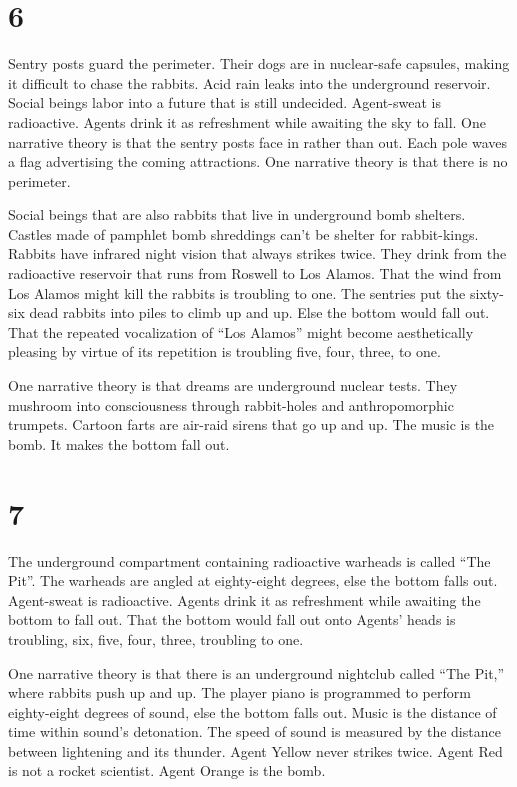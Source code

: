 \documentclass[
]{memoir}
\begin{document}
\hypertarget{section-7}{%
\section*{6}\label{section-7}}

Sentry posts guard the perimeter. Their dogs are in nuclear-safe
capsules, making it difficult to chase the rabbits. Acid rain leaks into
the underground reservoir. Social beings labor into a future that is
still undecided. Agent-sweat is radioactive. Agents drink it as
refreshment while awaiting the sky to fall. One narrative theory is that
the sentry posts face in rather than out. Each pole waves a flag
advertising the coming attractions. One narrative theory is that there
is no perimeter.

Social beings that are also rabbits that live in underground bomb
shelters. Castles made of pamphlet bomb shreddings can't be shelter for
rabbit-kings. Rabbits have infrared night vision that always strikes
twice. They drink from the radioactive reservoir that runs from Roswell
to Los Alamos. That the wind from Los Alamos might kill the rabbits is
troubling to one. The sentries put the sixty-six dead rabbits into piles
to climb up and up. Else the bottom would fall out. That the repeated
vocalization of ``Los Alamos'' might become aesthetically pleasing by
virtue of its repetition is troubling five, four, three, to one.

One narrative theory is that dreams are underground nuclear tests. They
mushroom into consciousness through rabbit-holes and anthropomorphic
trumpets. Cartoon farts are air-raid sirens that go up and up. The music
is the bomb. It makes the bottom fall out.

\hypertarget{section-8}{%
\section*{7}\label{section-8}}

The underground compartment containing radioactive warheads is called
``The Pit''. The warheads are angled at eighty-eight degrees, else the
bottom falls out. Agent-sweat is radioactive. Agents drink it as
refreshment while awaiting the bottom to fall out. That the bottom would
fall out onto Agents' heads is troubling, six, five, four, three,
troubling to one.

One narrative theory is that there is an underground nightclub called
``The Pit,'' where rabbits push up and up. The player piano is
programmed to perform eighty-eight degrees of sound, else the bottom
falls out. Music is the distance of time within sound's detonation. The
speed of sound is measured by the distance between lightening and its
thunder. Agent Yellow never strikes twice. Agent Red is not a rocket
scientist. Agent Orange is the bomb.
\end{document}

